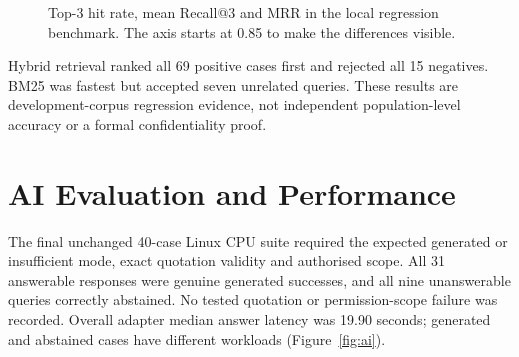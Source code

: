 \begin{figure}[htbp]
\centering
{}
\caption{Top-3 hit rate, mean Recall@3 and MRR in the local regression benchmark. The axis starts at 0.85 to make the differences visible.}
\label{fig:retrieval}
\end{figure}

Hybrid retrieval ranked all 69 positive cases first and rejected all 15 negatives. BM25 was fastest but accepted seven unrelated queries. These results are development-corpus regression evidence, not independent population-level accuracy or a formal confidentiality proof.

\section{AI Evaluation and Performance}

The final unchanged 40-case Linux CPU suite required the expected generated or insufficient mode, exact quotation validity and authorised scope. All 31 answerable responses were genuine generated successes, and all nine unanswerable queries correctly abstained. No tested quotation or permission-scope failure was recorded. Overall adapter median answer latency was 19.90 seconds; generated and abstained cases have different workloads (Figure~\ref{fig:ai}).

